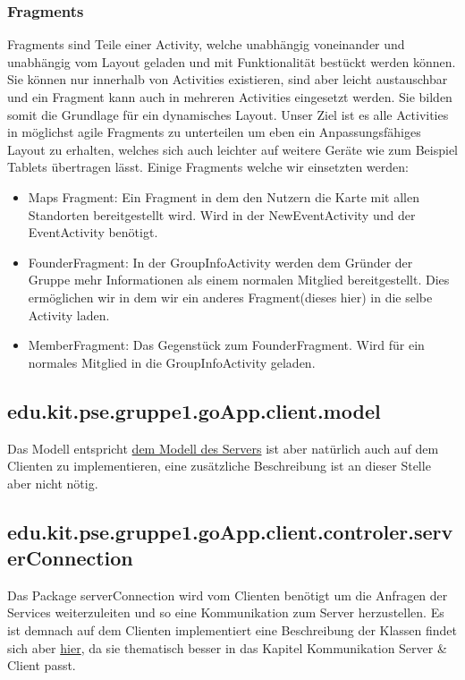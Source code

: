 	 \subsubsection{Fragments}
	 Fragments sind Teile einer Activity, welche unabhängig voneinander und unabhängig vom Layout geladen und mit Funktionalität bestückt werden können.  
	 Sie können nur innerhalb von Activities existieren, sind aber leicht austauschbar und ein Fragment kann auch in mehreren Activities eingesetzt werden. 
	 Sie bilden somit die Grundlage für ein dynamisches Layout. \newline
	 Unser Ziel ist es alle Activities in möglichst agile Fragments zu unterteilen um eben ein Anpassungsfähiges Layout zu erhalten, welches sich auch leichter auf weitere Geräte wie zum Beispiel Tablets übertragen lässt.
	 \newline Einige Fragments welche wir einsetzten werden:
	 \begin{itemize}
	 \item Maps Fragment: Ein Fragment in dem den Nutzern die Karte mit allen Standorten bereitgestellt wird. Wird in der NewEventActivity und der EventActivity benötigt.
	 \item FounderFragment: In der GroupInfoActivity werden dem Gründer der Gruppe mehr Informationen als einem normalen Mitglied bereitgestellt. Dies ermöglichen wir in dem wir ein anderes Fragment(dieses hier) in die selbe Activity laden.
	 \item MemberFragment: Das Gegenstück zum FounderFragment. Wird für ein normales Mitglied in die GroupInfoActivity geladen.
	 \end{itemize}
	 
	
	\subsection{edu.kit.pse.gruppe1.goApp.client.model}
	Das Modell entspricht \hyperlink{ServerModel}{dem Modell des Servers} ist aber natürlich auch auf dem Clienten zu implementieren, eine zusätzliche Beschreibung ist an dieser Stelle aber nicht nötig.
	
	\subsection{edu.kit.pse.gruppe1.goApp.client.controler.serverConnection}
	Das Package serverConnection wird vom Clienten benötigt um die Anfragen der Services weiterzuleiten und so eine Kommunikation zum Server herzustellen. Es ist demnach auf dem Clienten implementiert eine Beschreibung der Klassen findet sich aber \hyperlink{ServerConnection}{hier}, da sie thematisch besser in das Kapitel Kommunikation Server \& Client passt.